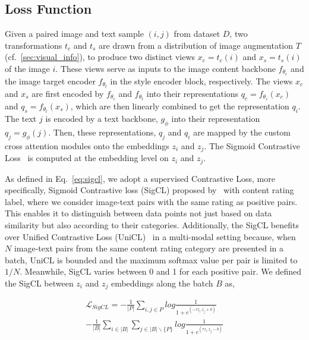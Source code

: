 \vspace{-0.15cm}
\subsection{Loss Function}
\label{subsec: loss fn}

Given a paired image and text sample $(i, j)$ from dataset $D$, two transformations $t_c$ and $t_s$ are drawn from a distribution of image augmentation $T$ (cf.~\ref{sec:visual_info}), to produce two distinct views $x_c = t_c(i)$ and $x_s = t_s(i)$ of the image $i$. These views serve as inputs to the image content backbone $f_{\theta_c}$ and the image target encoder $f_{\theta_t}$ in the style encoder block, respectively.
The views $x_c$ and $x_s$ are first encoded by $f_{\theta_c}$ and $f_{\theta_t}$ into their representations $q_c = f_{\theta_c}(x_c)$ and $q_s = f_{\theta_t}(x_s)$, which are then linearly combined to get the representation $q_i$. The text $j$ is encoded by a text backbone, $g_{\phi}$ into their representation $q_j = g_{\phi}(j)$. Then, these representations, $q_j$ and $q_i$ are mapped by the custom cross attention modules onto the embeddings $z_i$ and $z_j$. The Sigmoid Contrastive Loss~\cite{zhai2023sigmoid} is computed at the embedding level on $z_i$ and $z_j$. 

As defined in Eq.~\ref{eq:sigcl}, we adopt a supervised Contrastive Loss, more specifically, Sigmoid Contrastive loss (SigCL) proposed by~\cite{zhai2023sigmoid} with content rating label, where we consider image-text pairs with the same rating as positive pairs. This enables it to distinguish between data points not just based on data similarity but also according to their categories. Additionally, the SigCL benefits over Unified Contrastive Loss (UniCL)~\cite{yang2022unified} in a multi-modal setting because, when $N$ image-text pairs from the same content rating category are presented in a batch, UniCL is bounded and the maximum softmax value per pair is limited to $1/N$.  
Meanwhile, SigCL varies between 0 and 1 for each positive pair. We defined the SigCL between $z_i$ and $z_j$ embeddings along the batch $B$ as, 

\begin{multline}
\label{eq:sigcl}
    \mathcal{L}_{SigCL} =-\frac{1}{|P|} \sum_{i,j\in P} log \frac{1}{1+ e^{(-\tau z_i.z_j + b)}}\\
    -\frac{1}{|B|} \sum_{i\in|B|}\sum_{j\in|B|\backslash \{P\}} log \frac{1}{1+ e^{(\tau z_i.z_j - b)}}
\end{multline}

